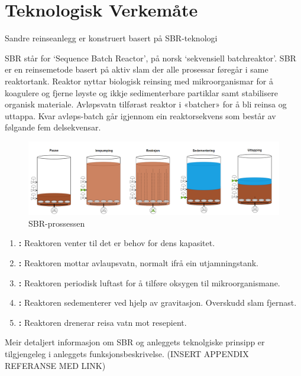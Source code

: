 \newpage
\section{Teknologisk Verkemåte}
\thispagestyle{fancy}
Sandre reinseanlegg er konstruert basert på SBR-teknologi

SBR står for `Sequence Batch Reactor', på norsk `sekvensiell batchreaktor'.\newline
SBR er en reinsemetode basert på aktiv slam der alle prosessar føregår i same reaktortank. 
Reaktor nyttar biologisk reinsing med mikroorganismar for å koagulere 
og fjerne løyste og ikkje sedimenterbare partiklar samt stabilisere organisk materiale. 
Avløpsvatn tilførast reaktor i «batcher» for å bli reinsa og uttappa. 
Kvar avløps-batch går igjennom ein reaktorsekvens som består av følgande fem delsekvensar.
\newline

\begin{figure}[htbp]
    \centering
    \includegraphics[width=1\textwidth]{Figurar/SBR-V2.png}
    \caption{SBR-prossessen}\label{fig:HMI}
\end{figure}


\begin{enumerate}
    \item \textbf{:} Reaktoren venter til det er behov for dens kapasitet.
    \item \textbf{:} Reaktoren mottar avlaupsvatn, normalt ifrå ein utjamningstank.
    \item \textbf{:} Reaktoren periodisk luftast for å tilføre oksygen til mikroorganismane.
    \item \textbf{:} Reaktoren sedementerer ved hjelp av gravitasjon. Overskudd slam fjernast.
    \item \textbf{:} Reaktoren drenerar reisa vatn mot resepient.
\end{enumerate}

Meir detaljert informasjon om SBR og anleggets teknolgiske prinsipp er tilgjengeleg i anleggets
funksjonsbeskrivelse. (INSERT APPENDIX REFERANSE MED LINK)

